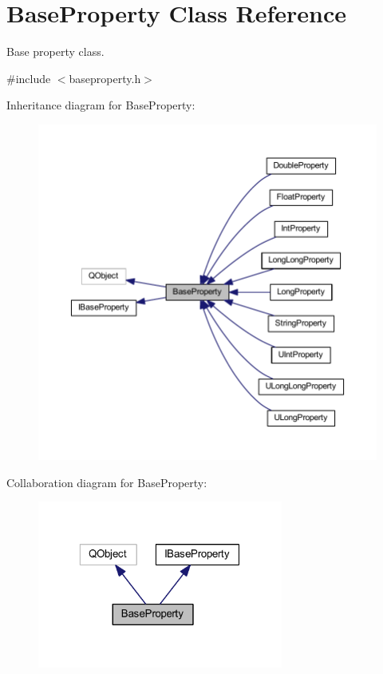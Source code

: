 \hypertarget{class_base_property}{\section{Base\-Property Class Reference}
\label{class_base_property}
}


Base property class.  




{\ttfamily \#include $<$baseproperty.\-h$>$}



Inheritance diagram for Base\-Property\-:
\nopagebreak
\begin{figure}[H]
\begin{center}
\leavevmode
\includegraphics[width=350pt]{class_base_property__inherit__graph}
\end{center}
\end{figure}


Collaboration diagram for Base\-Property\-:
\nopagebreak
\begin{figure}[H]
\begin{center}
\leavevmode
\includegraphics[width=229pt]{class_base_property__coll__graph}
\end{center}
\end{figure}
